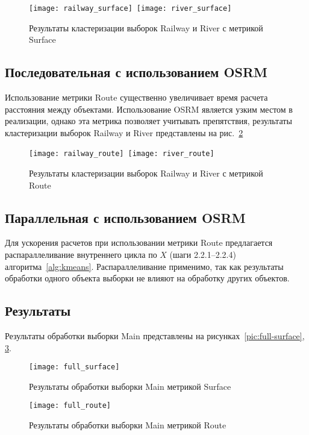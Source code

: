 \begin{figure}[h!]
    \texttt{[image: railway\_surface]}\
    \texttt{[image: river\_surface]} \\[1ex]
    \parbox{.95\textwidth}{\caption{Результаты кластеризации выборок Railway и River с метрикой Surface}\label{pic:test_surface_results}}
    \vspace*{-1ex}
\end{figure}

\subsection{Последовательная с использованием OSRM}
Использование метрики Route существенно увеличивает время расчета расстояния между объектами. Использование OSRM является узким местом в реализации, однако эта метрика позволяет учитывать препятствия, результаты кластеризации выборок Railway и River представлены на рис.~\ref{pic:test_route_results}

\begin{figure}[h!]
    \texttt{[image: railway\_route]}\
    \texttt{[image: river\_route]} \\[1ex]
    \parbox{.95\textwidth}{\caption{Результаты кластеризации выборок Railway и River с метрикой Route}\label{pic:test_route_results}}
    \vspace*{-1ex}
\end{figure}

\subsection{Параллельная с использованием OSRM}
Для ускорения расчетов при использовании метрики Route предлагается распараллеливание внутреннего цикла по \( X \) (шаги 2.2.1--2.2.4) алгоритма~\ref{alg:kmeans}. Распараллеливание применимо, так как результаты обработки одного объекта выборки не влияют на обработку других объектов.

\subsection{Результаты} \label{sec:workresults}
Результаты обработки выборки Main представлены на рисунках~\ref{pic:full-surface}, \ref{pic:full-route}.

\begin{figure}[h!]
    \centering
    \texttt{[image: full\_surface]}\\[1ex]
    \parbox{.95\textwidth}{\caption{Результаты обработки выборки Main метрикой Surface}\label{pic:full-surface}}
    \texttt{[image: full\_route]}\\[1ex]
    \parbox{.95\textwidth}{\caption{Результаты обработки выборки Main метрикой Route}\label{pic:full-route}}
\end{figure}

